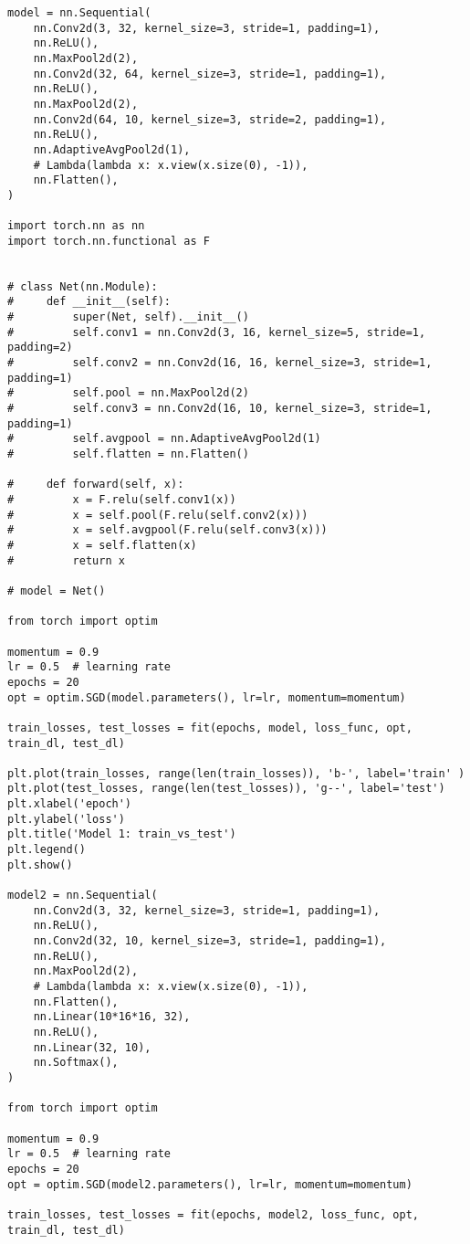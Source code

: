 \documentclass[12pt]{article}%
\begin{document}
\begin{lstlisting}
model = nn.Sequential(
    nn.Conv2d(3, 32, kernel_size=3, stride=1, padding=1),
    nn.ReLU(),
    nn.MaxPool2d(2),
    nn.Conv2d(32, 64, kernel_size=3, stride=1, padding=1),
    nn.ReLU(),
    nn.MaxPool2d(2),
    nn.Conv2d(64, 10, kernel_size=3, stride=2, padding=1),
    nn.ReLU(),
    nn.AdaptiveAvgPool2d(1),
    # Lambda(lambda x: x.view(x.size(0), -1)),
    nn.Flatten(),
)

import torch.nn as nn
import torch.nn.functional as F


# class Net(nn.Module):
#     def __init__(self):
#         super(Net, self).__init__()
#         self.conv1 = nn.Conv2d(3, 16, kernel_size=5, stride=1, padding=2)
#         self.conv2 = nn.Conv2d(16, 16, kernel_size=3, stride=1, padding=1)
#         self.pool = nn.MaxPool2d(2)
#         self.conv3 = nn.Conv2d(16, 10, kernel_size=3, stride=1, padding=1)
#         self.avgpool = nn.AdaptiveAvgPool2d(1)
#         self.flatten = nn.Flatten()

#     def forward(self, x):
#         x = F.relu(self.conv1(x))
#         x = self.pool(F.relu(self.conv2(x)))
#         x = self.avgpool(F.relu(self.conv3(x)))
#         x = self.flatten(x)
#         return x

# model = Net()

from torch import optim

momentum = 0.9
lr = 0.5  # learning rate
epochs = 20
opt = optim.SGD(model.parameters(), lr=lr, momentum=momentum)

train_losses, test_losses = fit(epochs, model, loss_func, opt, train_dl, test_dl)

plt.plot(train_losses, range(len(train_losses)), 'b-', label='train' )
plt.plot(test_losses, range(len(test_losses)), 'g--', label='test')
plt.xlabel('epoch')
plt.ylabel('loss')
plt.title('Model 1: train_vs_test')
plt.legend()
plt.show()

model2 = nn.Sequential(
    nn.Conv2d(3, 32, kernel_size=3, stride=1, padding=1),
    nn.ReLU(),
    nn.Conv2d(32, 10, kernel_size=3, stride=1, padding=1),
    nn.ReLU(),
    nn.MaxPool2d(2),
    # Lambda(lambda x: x.view(x.size(0), -1)),
    nn.Flatten(),
    nn.Linear(10*16*16, 32),
    nn.ReLU(),
    nn.Linear(32, 10),
    nn.Softmax(),
)

from torch import optim

momentum = 0.9
lr = 0.5  # learning rate
epochs = 20
opt = optim.SGD(model2.parameters(), lr=lr, momentum=momentum)

train_losses, test_losses = fit(epochs, model2, loss_func, opt, train_dl, test_dl)


\end{lstlisting}
\end{document}
